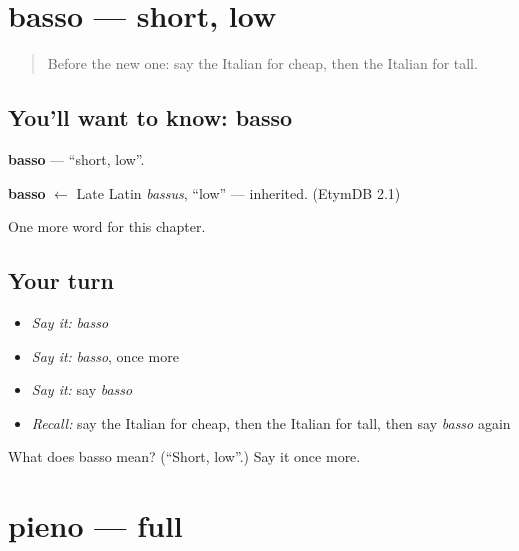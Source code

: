 \section[basso]{basso — short, low}

\label{lesson:IT-C75-basso}



\begin{quote}
Before the new one: say the Italian for cheap, then the Italian for tall.
\end{quote}

\subsection*{You'll want to know: basso}
\textbf{basso} — \textquotedblleft{}short, low\textquotedblright{}.

\begin{cousinweb}
\textbf{basso} $\leftarrow$ Late Latin \emph{bassus}, \textquotedblleft{}low\textquotedblright{} — inherited. (EtymDB 2.1)
\end{cousinweb}

\begin{grammarlens}[title={What you've built}]
One more word for this chapter.
\end{grammarlens}

\subsection*{Your turn}
\begin{itemize}
\raggedright
  \item \emph{Say it:} \emph{basso}
  \item \emph{Say it:} \emph{basso}, once more
  \item \emph{Say it:} say \emph{basso}
  \item \emph{Recall:} say the Italian for cheap, then the Italian for tall, then say \emph{basso} again
\end{itemize}

\begin{tcolorbox}[breakable,colback=teal!4,colframe=teal!35!black,title={Before you move on}]
What does basso mean? (\textquotedblleft{}Short, low\textquotedblright{}.) Say it once more.
\end{tcolorbox}
\section[pieno]{pieno — full}

